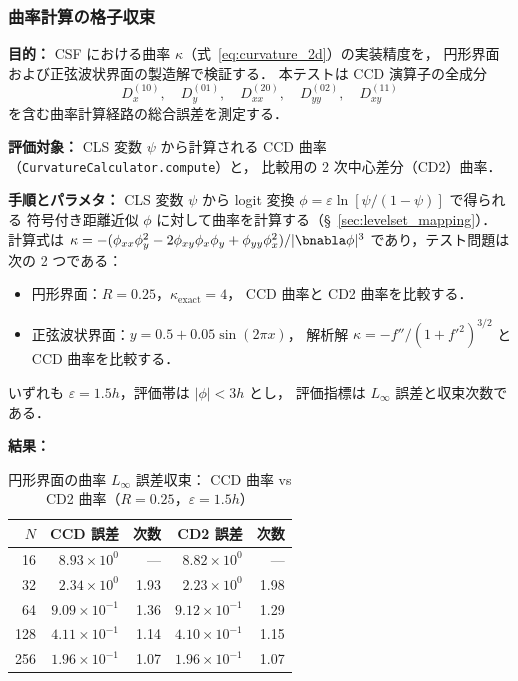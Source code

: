 \subsubsection{\texorpdfstring{曲率計算の格子収束}{曲率計算の格子収束}}
\label{sec:verify_curvature}

\noindent\textbf{目的：}
CSF における曲率 $\kappa$（式~\eqref{eq:curvature_2d}）の実装精度を，
円形界面および正弦波状界面の製造解で検証する．
本テストは CCD 演算子の全成分
\[
  D_x^{(10)},\quad D_y^{(01)},\quad
  D_{xx}^{(20)},\quad D_{yy}^{(02)},\quad D_{xy}^{(11)}
\]
を含む曲率計算経路の総合誤差を測定する．

\noindent\textbf{評価対象：}
CLS 変数 $\psi$ から計算される CCD 曲率
（\texttt{CurvatureCalculator.compute}）と，
比較用の 2 次中心差分（CD2）曲率．

\noindent\textbf{手順とパラメタ：}
CLS 変数 $\psi$ から logit 変換 $\phi = \varepsilon\ln[\psi/(1-\psi)]$ で得られる
符号付き距離近似 $\phi$ に対して曲率を計算する（§~\ref{sec:levelset_mapping}）．
計算式は
$\kappa = -(\phi_{xx}\phi_y^2 - 2\phi_{xy}\phi_x\phi_y + \phi_{yy}\phi_x^2)/|\bnabla\phi|^3$
であり，テスト問題は次の 2 つである：
\begin{itemize}[noitemsep]
  \item 円形界面：$R=0.25$，$\kappa_{\mathrm{exact}} = 4$，
        CCD 曲率と CD2 曲率を比較する．
  \item 正弦波状界面：$y = 0.5 + 0.05\sin(2\pi x)$，
        解析解 $\kappa = -f''/(1+f'^2)^{3/2}$ と CCD 曲率を比較する．
\end{itemize}
いずれも $\varepsilon = 1.5h$，評価帯は $|\phi| < 3h$ とし，
評価指標は $L_\infty$ 誤差と収束次数である．

\noindent\textbf{結果：}

\begin{table}[htbp]
\centering
\caption{円形界面の曲率 $L_\infty$ 誤差収束：
  CCD 曲率 vs CD2 曲率（$R=0.25$，$\varepsilon = 1.5h$）}
\label{tab:curvature_circle}
\renewcommand{\arraystretch}{1.3}
\begin{tabular}{rrrrr}
\toprule
$N$ & CCD 誤差 & 次数 & CD2 誤差 & 次数 \\
\midrule
 16 & $8.93 \times 10^{0}$ & ---  & $8.82 \times 10^{0}$ & ---  \\
 32 & $2.34 \times 10^{0}$ & 1.93 & $2.23 \times 10^{0}$ & 1.98 \\
 64 & $9.09 \times 10^{-1}$ & 1.36 & $9.12 \times 10^{-1}$ & 1.29 \\
128 & $4.11 \times 10^{-1}$ & 1.14 & $4.10 \times 10^{-1}$ & 1.15 \\
256 & $1.96 \times 10^{-1}$ & 1.07 & $1.96 \times 10^{-1}$ & 1.07 \\
\bottomrule
\end{tabular}
\end{table}


